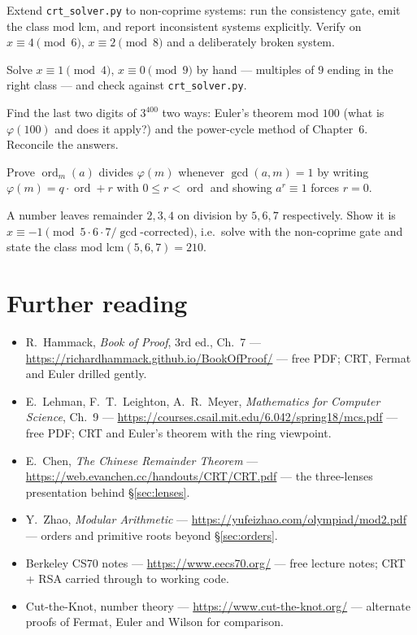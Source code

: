 \begin{exercise}[hard]
Extend \texttt{crt\_solver.py} to non-coprime systems: run the
consistency gate, emit the class mod $\mathrm{lcm}$, and report
inconsistent systems explicitly. Verify on $x \equiv 4 \pmod 6$,
$x \equiv 2 \pmod 8$ and a deliberately broken system.
\end{exercise}
\begin{exercise}[easy]
Solve $x \equiv 1 \pmod 4$, $x \equiv 0 \pmod 9$ by hand --- multiples of
$9$ ending in the right class --- and check against \texttt{crt\_solver.py}.
\end{exercise}
\begin{exercise}[medium]
Find the last two digits of $3^{400}$ two ways: Euler's theorem mod $100$
(what is $\varphi(100)$ and does it apply?) and the power-cycle method of
Chapter~6. Reconcile the answers.
\end{exercise}
\begin{exercise}[medium]
Prove $\operatorname{ord}_m(a)$ divides $\varphi(m)$ whenever
$\gcd(a,m) = 1$ by writing $\varphi(m) = q\cdot\operatorname{ord} + r$ with
$0 \le r < \operatorname{ord}$ and showing $a^r \equiv 1$ forces $r = 0$.
\end{exercise}
\begin{exercise}[hard]
A number leaves remainder $2,3,4$ on division by $5,6,7$ respectively.
Show it is $x \equiv -1 \pmod{5\cdot6\cdot7/\gcd\text{-corrected}}$, i.e.\
solve with the non-coprime gate and state the class mod
$\mathrm{lcm}(5,6,7) = 210$.
\end{exercise}

\section*{Further reading}
\begin{itemize}
\item R.~Hammack, \emph{Book of Proof}, 3rd ed., Ch.~7 ---
\url{https://richardhammack.github.io/BookOfProof/} --- free PDF;
CRT, Fermat and Euler drilled gently.
\item E.~Lehman, F.~T.~Leighton, A.~R.~Meyer, \emph{Mathematics for
Computer Science}, Ch.~9 ---
\url{https://courses.csail.mit.edu/6.042/spring18/mcs.pdf} --- free PDF;
CRT and Euler's theorem with the ring viewpoint.
\item E.~Chen, \emph{The Chinese Remainder Theorem} ---
\url{https://web.evanchen.cc/handouts/CRT/CRT.pdf} --- the
three-lenses presentation behind \S\ref{sec:lenses}.
\item Y.~Zhao, \emph{Modular Arithmetic} ---
\url{https://yufeizhao.com/olympiad/mod2.pdf} --- orders and primitive
roots beyond \S\ref{sec:orders}.
\item Berkeley CS70 notes ---
\url{https://www.eecs70.org/} --- free lecture notes; CRT + RSA carried
through to working code.
\item Cut-the-Knot, number theory ---
\url{https://www.cut-the-knot.org/} --- alternate proofs of Fermat,
Euler and Wilson for comparison.
\end{itemize}


